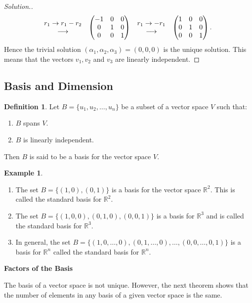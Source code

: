 \documentclass[11pt,a4paper]{article}
\theoremstyle{definition}
\newtheorem{defn}[thm]{Definition}
\newtheorem{exa}[thm]{Example}
\newenvironment{solution}
  {\renewcommand{\qedsymbol}{}\begin{proof}[\textit{Solution}.]}
  {\end{proof}}
\begin{document}
\begin{solution}
\begin{align*}
& \hspace{0.3cm}
\begin{matrix}
r_1\rightarrow r_1-r_2\\ \longrightarrow\\
\end{matrix}
\hspace{0.3cm}
\begin{pmatrix}
-1&0&0\\0&1&0\\0&0&1\\
\end{pmatrix}
\hspace{0.3cm}
\begin{matrix}
r_1\rightarrow -r_1\\ \longrightarrow\\
\end{matrix}
\hspace{0.3cm}
\begin{pmatrix}
1&0&0\\0&1&0\\0&0&1\\
\end{pmatrix}.
\end{align*}
Hence the trivial solution $(\alpha_1,\alpha_2, \alpha_3)=(0,0,0)$ is the unique solution. This means that the vectors $v_1, v_2$ and $v_3$ are linearly independent.
\end{solution}


\subsection{Basis and Dimension}
\begin{defn}
Let $B=\{u_1,u_2,\dots,u_n\}$ be a subset of a vector space $V$ such that:
\begin{enumerate}
\item[i.] $B$ spans $V$.
\item[ii.] $B$ is linearly independent.
\end{enumerate}
Then $B$ is said to be a basis for the vector space $V$.
\end{defn}


\begin{exa}
\begin{enumerate}
\item The set $B=\{(1,0), (0,1)\}$ is a basis for the vector space $\mathbb{R}^2$. This is called the standard basis for $\mathbb{R}^2$.
\item The set $B=\{(1,0,0), (0,1,0), (0,0,1)\}$ is a basis for $\mathbb{R}^3$ and is called the standard basis for $\mathbb{R}^3$.
\item In general, the set $B=\{(1,0,\dots,0), (0,1,\dots,0),\dots,(0,0,\dots,0,1)\}$ is a basis for $\mathbb{R}^n$ called the standard basis for $\mathbb{R}^n$.
\end{enumerate}

\textbf{Factors of the Basis}
\end{exa}
The basis of a vector space is not unique. However, the next theorem shows that the number of elements in any basis of a given vector space is the same.
\end{document}
